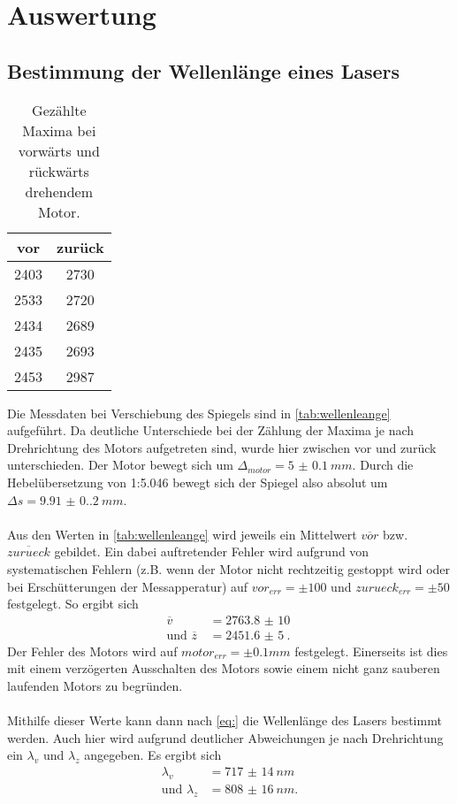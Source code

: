 \section{Auswertung}
\label{sec:Auswertung}

\subsection{Bestimmung der Wellenlänge eines Lasers}
\begin{table}[H]
  \centering
  \caption{Gezählte Maxima bei vorwärts und rückwärts drehendem Motor.}
  \begin{tabular}{c c}
      \toprule
      vor & zurück\\
      \midrule
      2403 & 2730\\
      2533 & 2720\\
      2434 & 2689\\
      2435 & 2693\\
      2453 & 2987\\
      \bottomrule
  \end{tabular}
  \label{tab:wellenleange}
\end{table}
Die Messdaten bei Verschiebung des Spiegels sind in \autoref{tab:wellenleange} aufgeführt. Da deutliche Unterschiede bei der Zählung der 
Maxima je nach Drehrichtung des Motors aufgetreten sind, wurde hier zwischen vor und zurück unterschieden. Der Motor bewegt sich um 
$\Delta_{motor} = \SI{5(0.1)}{mm}$. Durch die Hebelübersetzung von 1:5.046 bewegt sich der Spiegel also absolut um $\Delta s = \SI{9.91(0.2)}{mm}$.
\\
\\
Aus den Werten in \autoref{tab:wellenleange} wird jeweils ein Mittelwert $\overline{vor}$ bzw. $\overline{zurueck}$ gebildet. Ein dabei auftretender Fehler wird aufgrund von 
systematischen Fehlern (z.B. wenn der Motor nicht rechtzeitig gestoppt wird oder bei Erschütterungen der Messapperatur) auf $vor_{err} = \pm 100$ und $zurueck_{err} = \pm 50$ festgelegt.
So ergibt sich 
\begin{align*}
  \overline{v} &= \SI{2763.8(100)}{}\\
  \text{und } \overline{z}\, &= \SI{2451.6(50)}{}.
\end{align*}
Der Fehler des Motors wird auf $motor_{err} = \pm 0.1 \unit{mm}$ festgelegt. Einerseits ist dies mit einem verzögerten Ausschalten des Motors sowie einem nicht
ganz sauberen laufenden Motors zu begründen.
\\
\\
Mithilfe dieser Werte kann dann nach \autoref{eq:} die Wellenlänge des Lasers bestimmt werden. Auch hier wird aufgrund deutlicher Abweichungen je nach Drehrichtung
ein $\lambda_{v}$ und $\lambda_{z}$ angegeben.
Es ergibt sich 
\begin{align*}
  \lambda_{v} &= \SI{717(14)}{nm}\\
  \text{und } \lambda_{z} &= \SI{808(16)}{nm}.
\end{align*}

\subsection{}
